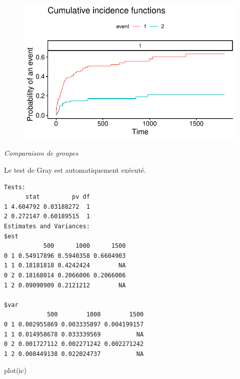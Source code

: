 \documentclass[
  12pt,
  letterpaper,
  DIV=11,
  numbers=noendperiod,
  onepage,
  openany]{scrreprt}
\newenvironment{Shaded}{\begin{snugshade}}{\end{snugshade}}
\newcommand{\AttributeTok}[1]{\textcolor[rgb]{0.80,0.80,0.80}{#1}}
\newcommand{\DecValTok}[1]{\textcolor[rgb]{0.86,0.86,0.80}{#1}}
\newcommand{\FunctionTok}[1]{\textcolor[rgb]{0.94,0.94,0.56}{#1}}
\newcommand{\NormalTok}[1]{\textcolor[rgb]{0.80,0.80,0.80}{#1}}
\newcommand{\OtherTok}[1]{\textcolor[rgb]{0.94,0.94,0.56}{#1}}
\newcommand{\SpecialCharTok}[1]{\textcolor[rgb]{0.86,0.64,0.64}{#1}}
\begin{document}
\begin{figure}[H]

{\centering \includegraphics{14-R_files/figure-pdf/unnamed-chunk-43-1.pdf}

}

\end{figure}

\emph{Comparaison de groupes}

Le test de Gray est automatiquement exécuté.

\begin{Shaded}
\end{Shaded}

\begin{verbatim}
Tests:
      stat         pv df
1 4.604792 0.03188272  1
2 0.272147 0.60189515  1
Estimates and Variances:
$est
           500      1000      1500
0 1 0.54917896 0.5940358 0.6604903
1 1 0.18181818 0.4242424        NA
0 2 0.18168014 0.2066006 0.2066006
1 2 0.09090909 0.2121212        NA

$var
            500        1000        1500
0 1 0.002955869 0.003335897 0.004199157
1 1 0.014958678 0.033339569          NA
0 2 0.001727112 0.002271242 0.002271242
1 2 0.008449138 0.022024737          NA
\end{verbatim}

\begin{Shaded}
\begin{Highlighting}[]
\FunctionTok{plot}\NormalTok{(ic)}
\end{Highlighting}
\end{Shaded}
\end{document}
